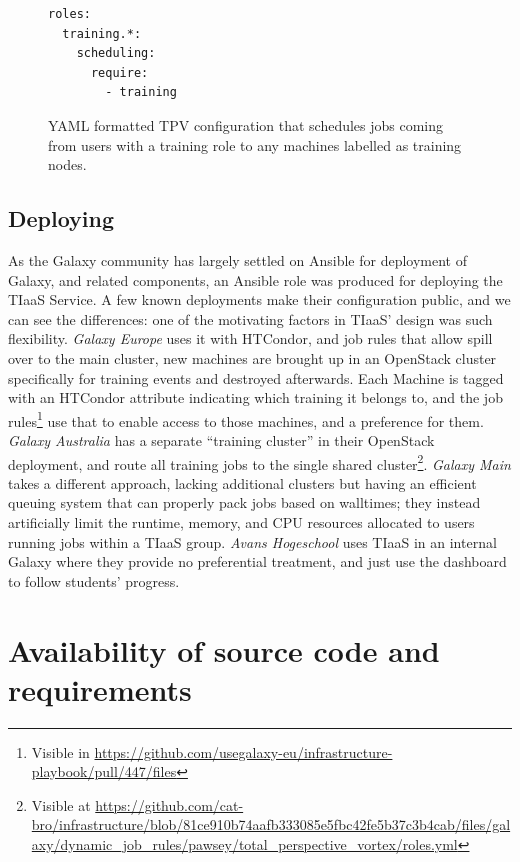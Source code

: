 \documentclass[a4paper,num-refs]{oup-contemporary}
\begin{document}
\begin{figure}[!ht]
\centering
\begin{lstlisting}[frame=single,language=bash]  % Start your code-block
roles:
  training.*:
    scheduling:
      require:
        - training
\end{lstlisting}
\caption{YAML formatted TPV configuration that schedules jobs coming from users with a training role to any machines labelled as training nodes.\label{code:tpv}}
\end{figure}

\subsection{Deploying}
As the Galaxy community has largely settled on Ansible for deployment of Galaxy, and related components, an Ansible role was produced for deploying the TIaaS Service. A few known deployments make their configuration public, and we can see the differences: one of the motivating factors in TIaaS' design was such flexibility. \emph{Galaxy Europe} uses it with HTCondor, and job rules that allow spill over to the main cluster, new machines are brought up in an OpenStack cluster specifically for training events and destroyed afterwards. Each Machine is tagged with an HTCondor attribute indicating which training it belongs to, and the job rules\footnote{Visible in \url{https://github.com/usegalaxy-eu/infrastructure-playbook/pull/447/files}} use that to enable access to those machines, and a preference for them. \emph{Galaxy Australia} has a separate ``training cluster'' in their OpenStack deployment, and route all training jobs to the single shared cluster\footnote{Visible at \url{https://github.com/cat-bro/infrastructure/blob/81ce910b74aafb333085e5fbc42fe5b37c3b4cab/files/galaxy/dynamic_job_rules/pawsey/total_perspective_vortex/roles.yml}}. \emph{Galaxy Main} takes a different approach, lacking additional clusters but having an efficient queuing system that can properly pack jobs based on walltimes; they instead artificially limit the runtime, memory, and CPU resources allocated to users running jobs within a TIaaS group. \emph{Avans Hogeschool} uses TIaaS in an internal Galaxy where they provide no preferential treatment, and just use the dashboard to follow students' progress.

\section{Availability of source code and requirements}
\end{document}
